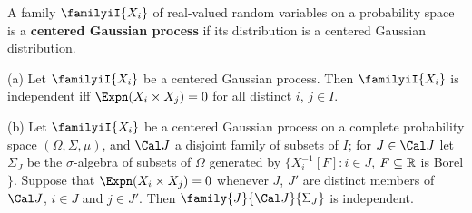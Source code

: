  A family $\familyiI{X_i}$ of real-valued
random variables on a probability space is a
{\bf centered Gaussian process} if its distribution
is a centered Gaussian distribution.

(a) Let $\familyiI{X_i}$ be a centered
Gaussian process.   Then $\familyiI{X_i}$ is independent iff
$\Expn(X_i\times X_j)=0$ for all distinct $i$, $j\in I$.

(b)
Let $\familyiI{X_i}$ be a centered Gaussian process on a complete
probability space $(\Omega,\Sigma,\mu)$, and
$\Cal J$ a disjoint family of subsets of $I$;  for $J\in\Cal J$ let
$\Sigma_J$ be the $\sigma$-algebra of subsets of $\Omega$ generated by
$\{X_i^{-1}[F]:i\in J$, $F\subseteq\Bbb R$ is Borel$\}$.
Suppose that $\Expn(X_i\times X_j)=0$
whenever $J$, $J'$ are distinct members of $\Cal J$, $i\in J$ and
$j\in J'$.   Then $\family{J}{\Cal J}{\Sigma_J}$ is independent.

